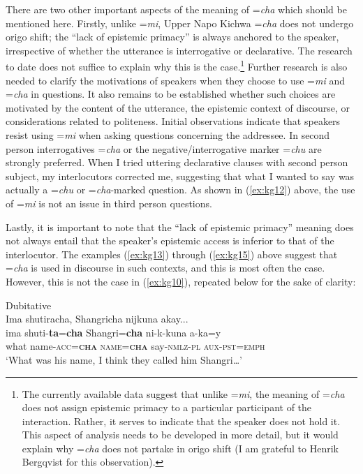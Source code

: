 \documentclass[output=paper]{langscibook}
\begin{document}
There are two other important aspects of the meaning of =\textit{cha} which should be mentioned here. Firstly, unlike =\textit{mi}, Upper Napo Kichwa =\textit{cha} does not undergo origo shift; the “lack of epistemic primacy” is always anchored to the speaker, irrespective of whether the utterance is interrogative or declarative. The research to date does not suffice to explain why this is the case.\footnote{The currently available data suggest that unlike =\textit{mi}, the meaning of =\textit{cha} does not assign epistemic primacy to a particular participant of the interaction. Rather, it serves to indicate that the speaker does not hold it. This aspect of analysis needs to be developed in more detail, but it would explain why =\textit{cha} does not partake in origo shift (I am grateful to Henrik Bergqvist for this observation).} Further research is also needed to clarify the motivations of speakers when they choose to use =\textit{mi} and =\textit{cha} in questions. It also remains to be established whether such choices are motivated by the content of the utterance, the epistemic context of discourse, or considerations related to politeness. Initial observations indicate that speakers resist using =\textit{mi} when asking questions concerning the addressee. In second person interrogatives =\textit{cha} or the negative/interrogative marker =\textit{chu} are strongly preferred. When I tried uttering declarative clauses with second person subject, my interlocutors corrected me, suggesting that what I wanted to say was actually a =\textit{chu} or =\textit{cha}-marked question. As shown in (\ref{ex:kg12}) above, the use of =\textit{mi} is not an issue in third person questions.

Lastly, it is important to note that the “lack of epistemic primacy” meaning does not always entail that the speaker’s epistemic access is inferior to that of the interlocutor. The examples (\ref{ex:kg13}) through (\ref{ex:kg15}) above suggest that =\textit{cha} is used in discourse in such contexts, and this is most often the case. However, this is not the case in (\ref{ex:kg10}), repeated below for the sake of clarity:

\begin{exe}
	 Dubitative\\
	\glll Ima shutiracha, Shangricha nijkuna akay...\\
	ima shuti-\textbf{ta}=\textbf{cha} Shangri=\textbf{cha} ni-k-kuna a-ka=y\\
	what name-\textsc{acc}=\textbf{\textsc{cha}} \textsc{name}=\textbf{\textsc{cha}} say-\textsc{nmlz}-\textsc{pl} \textsc{aux}-\textsc{pst}=\textsc{emph}\\
	\trans ‘What was his name, I think they called him Shangri…’ \newline [in\_26052013\_02 132]
\end{exe}
\end{document}
